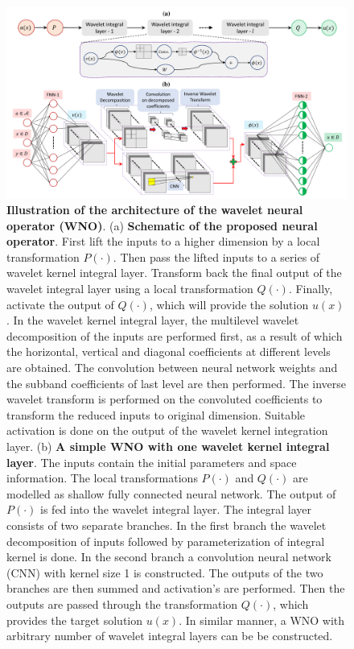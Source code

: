 \documentclass{article}
\begin{document}
\begin{figure}[ht!]
	\centering
	\includegraphics[width=\textwidth]{WNN.pdf}
	\caption{\textbf{Illustration of the architecture of the wavelet neural operator (WNO)}. (a) \textbf{Schematic of the proposed neural operator}. First lift the inputs to a higher dimension by a local transformation $P(\cdot)$. Then pass the lifted inputs to a series of wavelet kernel integral layer. Transform back the final output of the wavelet integral layer using a local transformation $Q(\cdot)$. Finally, activate the output of $Q(\cdot)$, which will provide the solution $u(x)$. In the wavelet kernel integral layer, the multilevel wavelet decomposition of the inputs are performed first, as a result of which the horizontal, vertical and diagonal coefficients at different levels are obtained. The convolution between neural network weights and the subband coefficients of last level are then performed. The inverse wavelet transform is performed on the convoluted coefficients to transform the reduced inputs to original dimension. Suitable activation is done on the output of the wavelet kernel integration layer. (b) \textbf{A simple WNO with one wavelet kernel integral layer}. The inputs contain the initial parameters and space information. The local transformations $P(\cdot)$ and $Q(\cdot)$ are modelled as shallow fully connected neural network. The output of $P(\cdot)$ is fed into the wavelet integral layer. The integral layer consists of two separate branches. In the first branch the wavelet decomposition of inputs followed by parameterization of integral kernel is done. In the second branch a convolution neural network (CNN) with kernel size 1 is constructed. The outputs of the two branches are then summed and activation's are performed. Then the outputs are passed through the transformation $Q(\cdot)$, which provides the target solution $u(x)$. In similar manner, a WNO with arbitrary number of wavelet integral layers can be be constructed.}
	\label{fig_methodology}
\end{figure}
\end{document}
